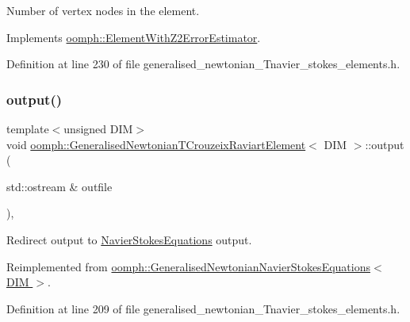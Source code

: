 Number of vertex nodes in the element. 



Implements \hyperlink{classoomph_1_1ElementWithZ2ErrorEstimator_a19495a0e77ef4ff35f15fdf7913b4077}{oomph\+::\+Element\+With\+Z2\+Error\+Estimator}.



Definition at line 230 of file generalised\+\_\+newtonian\+\_\+\+Tnavier\+\_\+stokes\+\_\+elements.\+h.

\mbox{\label{classoomph_1_1GeneralisedNewtonianTCrouzeixRaviartElement_a483703d25945a08046f0792e0321bc59}} 
\subsubsection{\texorpdfstring{output()}{output()}\hspace{0.1cm}{\footnotesize\ttfamily [1/4]}}
{\footnotesize\ttfamily template$<$unsigned D\+IM$>$ \\
void \hyperlink{classoomph_1_1GeneralisedNewtonianTCrouzeixRaviartElement}{oomph\+::\+Generalised\+Newtonian\+T\+Crouzeix\+Raviart\+Element}$<$ D\+IM $>$\+::output (\begin{DoxyParamCaption}\item[{std\+::ostream \&}]{outfile }\end{DoxyParamCaption})\hspace{0.3cm}{\ttfamily [inline]}, {\ttfamily [virtual]}}



Redirect output to \hyperlink{classoomph_1_1NavierStokesEquations}{Navier\+Stokes\+Equations} output. 



Reimplemented from \hyperlink{classoomph_1_1GeneralisedNewtonianNavierStokesEquations_a1f84ecb8a91df11868349a1e826074bd}{oomph\+::\+Generalised\+Newtonian\+Navier\+Stokes\+Equations$<$ D\+I\+M $>$}.



Definition at line 209 of file generalised\+\_\+newtonian\+\_\+\+Tnavier\+\_\+stokes\+\_\+elements.\+h.



